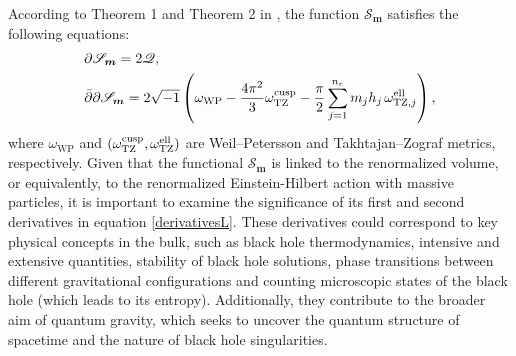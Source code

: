 \documentclass[a4paper,11pt]{article}
\newcommand{\Gpotential}{\mathscr{S}}
\begin{document}
According to Theorem 1 and Theorem 2 in \cite{Taghavi2024classical}, the function $\Gpotential_{\boldsymbol{m}}$ satisfies the following equations:
\begin{equation}
\begin{split}
&\partial \Gpotential_{\boldsymbol{m}} = 2 \mathscr{Q},\\&\bar{\partial} \partial \Gpotential_{\boldsymbol{m}} = 2\sqrt{-1}\left(\omega_{\text{WP}}-\frac{4\pi^2}{3} \omega^{\text{\text{cusp}}}_{\text{TZ}}- \frac{\pi}{2} \sum_{j=1}^{n_e} m_j h_j \hspace{.5mm}\omega^{\text{\text{ell}}}_{\text{TZ},j}\right),\label{derivativesL}
\end{split}
\end{equation}
where $\omega_{\text{WP}}$ and $(\omega^{\text{\text{cusp}}}_{\text{TZ}},\omega^{\text{\text{ell}}}_{\text{TZ}})$ are Weil--Petersson and Takhtajan--Zograf metrics, respectively. Given that the functional $\Gpotential_{\boldsymbol{m}}$ is linked to the renormalized volume, or equivalently, to the renormalized Einstein-Hilbert action with massive particles, it is important to examine the significance of its first and second derivatives in equation \eqref{derivativesL}. These derivatives could correspond to key physical concepts in the bulk, such as black hole thermodynamics, intensive and extensive quantities, stability of black hole solutions, phase transitions between different gravitational configurations and counting microscopic states of the black hole (which leads to its entropy). Additionally, they contribute to the broader aim of quantum gravity, which seeks to uncover the quantum structure of spacetime and the nature of black hole singularities.
\end{document}
